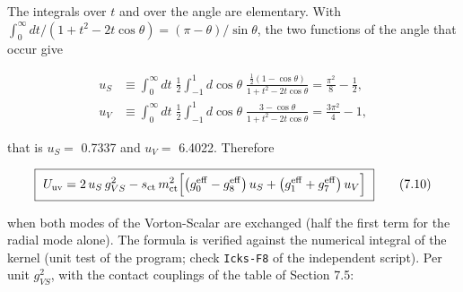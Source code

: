 \documentclass[
  10pt,
]{article}
\begin{document}
The integrals over \(t\) and over the angle are elementary. With
\(\int_0^\infty dt/(1+t^2-2t\cos\theta)=(\pi-\theta)/\sin\theta\), the
two functions of the angle that occur give

\[\begin{aligned}
u_S&\equiv\int_0^\infty dt\;\frac12\int_{-1}^{1}d\cos\theta\;\frac{\tfrac12(1-\cos\theta)}{1+t^2-2t\cos\theta}=\frac{\pi^2}{8}-\frac12,\\
u_V&\equiv\int_0^\infty dt\;\frac12\int_{-1}^{1}d\cos\theta\;\frac{3-\cos\theta}{1+t^2-2t\cos\theta}=\frac{3\pi^2}{4}-1,
\end{aligned}\tag{7.9}\]

that is \(u_S=\) 0.7337 and \(u_V=\) 6.4022. Therefore

\[\boxed{\ U_{\rm uv}=2\,u_S\,g_{VS}^2-s_{\rm ct}\,m_{\rm ct}^2\Big[\big(g_0^{\rm eff}-g_8^{\rm eff}\big)\,u_S+\big(g_1^{\rm eff}+g_7^{\rm eff}\big)\,u_V\Big]\ }\tag{7.10}\]

when both modes of the Vorton-Scalar are exchanged (half the first term
for the radial mode alone). The formula is verified against the
numerical integral of the kernel (unit test of the program; check
\texttt{Icks-F8} of the independent script). Per unit \(g_{VS}^2\), with
the contact couplings of the table of Section 7.5:
\end{document}
